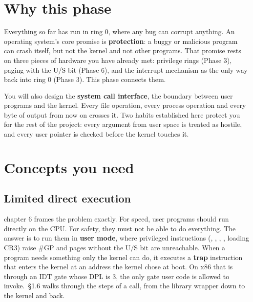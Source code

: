 \documentclass[11pt,a4paper]{article}
\begin{document}


\section{Why this phase}

Everything so far has run in ring 0, where any bug can corrupt anything. An operating system's core promise is
\textbf{protection}: a buggy or malicious program can crash itself, but not the kernel and not other programs. That
promise rests on three pieces of hardware you have already met: privilege rings (Phase 3), paging with the U/S bit
(Phase 6), and the interrupt mechanism as the only way back into ring 0 (Phase 3). This phase connects them.

You will also design the \textbf{system call interface}, the boundary between user programs and the kernel. Every
file operation, every process operation and every byte of output from now on crosses it. Two habits established here
protect you for the rest of the project: every argument from user space is treated as hostile, and every user pointer
is checked before the kernel touches it.

\section{Concepts you need}

\subsection{Limited direct execution}

\OSTEP chapter 6 frames the problem exactly. For speed, user programs should run directly on the CPU. For safety, they
must not be able to do everything. The answer is to run them in \textbf{user mode}, where privileged instructions
(, , , , loading CR3) raise \#GP and pages without the U/S bit are
unreachable. When a program needs something only the kernel can do, it executes a \textbf{trap} instruction that
enters the kernel at an address the kernel chose at boot. On x86 that is  through an IDT gate whose DPL
is 3, the only gate user code is allowed to invoke. \MOS\,\S1.6 walks through the steps of a  call, from
the library wrapper down to the kernel and back.
\end{document}
